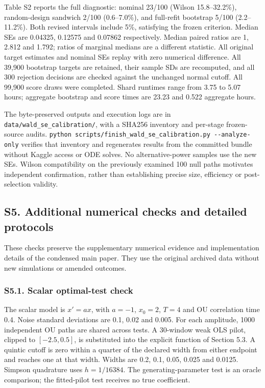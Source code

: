 \documentclass[
  american,
  11pt,
]{article}
\begin{document}
Table S2 reports the full diagnostic: nominal 23/100 (Wilson
15.8--32.2\%), random-design sandwich 2/100 (0.6--7.0\%), and full-refit
bootstrap 5/100 (2.2--11.2\%). Both revised intervals include 5\%,
satisfying the frozen criterion. Median SEs are 0.04325, 0.12575 and
0.07862 respectively. Median paired ratios are 1, 2.812 and 1.792;
ratios of marginal medians are a different statistic. All original
target estimates and nominal SEs replay with zero numerical difference.
All 39,900 bootstrap targets are retained, their sample SDs are
recomputed, and all 300 rejection decisions are checked against the
unchanged normal cutoff. All 99,900 score draws were completed. Shard
runtimes range from 3.75 to 5.07 hours; aggregate bootstrap and score
times are 23.23 and 0.522 aggregate hours.

The byte-preserved outputs and execution logs are in
\texttt{data/wald\_se\_calibration/}, with a SHA256 inventory and
per-stage frozen-source audits.
\texttt{python\ scripts/finish\_wald\_se\_calibration.py\ -\/-analyze-only}
verifies that inventory and regenerates results from the committed
bundle without Kaggle access or ODE solves. No alternative-power samples
use the new SEs. Wilson compatibility on the previously examined 100
null paths motivates independent confirmation, rather than establishing
precise size, efficiency or post-selection validity.

\subsection{S5. Additional numerical checks and detailed
protocols}\label{s5.-additional-numerical-checks-and-detailed-protocols}

These checks preserve the supplementary numerical evidence and
implementation details of the condensed main paper. They use the
original archived data without new simulations or amended outcomes.

\subsubsection{S5.1. Scalar optimal-test
check}\label{s5.1.-scalar-optimal-test-check}

The scalar model is \(x'=ax\), with \(a=-1\), \(x_0=2\), \(T=4\) and OU
correlation time 0.4. Noise standard deviations are 0.1, 0.02 and 0.005.
For each amplitude, 1000 independent OU paths are shared across tests. A
30-window weak OLS pilot, clipped to \([-2.5,0.5]\), is substituted into
the explicit function of Section 5.3. A quintic cutoff is zero within a
quarter of the declared width from either endpoint and reaches one at
that width. Widths are 0.2, 0.1, 0.05, 0.025 and 0.0125. Simpson
quadrature uses \(h=1/16384\). The generating-parameter test is an
oracle comparison; the fitted-pilot test receives no true coefficient.
\end{document}
